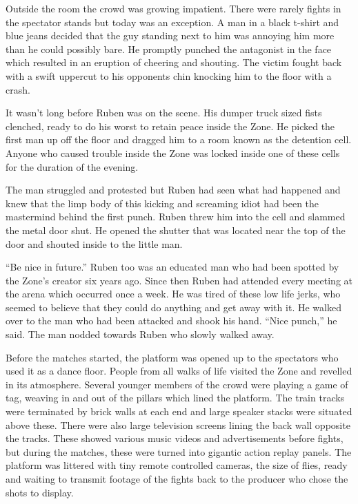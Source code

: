 Outside the room the crowd was growing impatient.  There were rarely fights in the spectator stands but today was an exception.  A man in a black t-shirt and blue jeans decided that the guy standing next to him was annoying him more than he could possibly bare.  He promptly punched the antagonist in the face which resulted in an eruption of cheering and shouting.  The victim fought back with a swift uppercut to his opponents chin knocking him to the floor with a crash.  

It wasn't long before Ruben was on the scene.  His dumper truck sized fists clenched, ready to do his worst to retain peace inside the Zone.  He picked the first man up off the floor and dragged him to a room known as the detention cell.  Anyone who caused trouble inside the Zone was locked inside one of these cells for the duration of the evening.

The man struggled and protested but Ruben had seen what had happened and knew that the limp body of this kicking and screaming idiot had been the mastermind behind the first punch.  Ruben threw him into the cell and slammed the metal door shut.  He opened the shutter that was located near the top of the door and shouted inside to the little man.

``Be nice in future.''  Ruben too was an educated man who had been spotted by the Zone's creator six years ago.  Since then Ruben had attended every meeting at the arena which occurred once a week.  He was tired of these low life jerks, who seemed to believe that they could do anything and get away with it.  He walked over to the man who had been attacked and shook his hand.  ``Nice punch,'' he said.  The man nodded towards Ruben who slowly walked away.

Before the matches started, the platform was opened up to the spectators who used it as a dance floor.  People from all walks of life visited the Zone and revelled in its atmosphere.  Several younger members of the crowd were playing a game of tag, weaving in and out of the pillars which lined the platform.  The train tracks were terminated by brick walls at each end and large speaker stacks were situated above these.  There were also large television screens lining the back wall opposite the tracks.  These showed various music videos and advertisements before fights, but during the matches, these were turned into gigantic action replay panels.  The platform was littered with tiny remote controlled cameras, the size of flies, ready and waiting to transmit footage of the fights back to the producer who chose the shots to display.  

